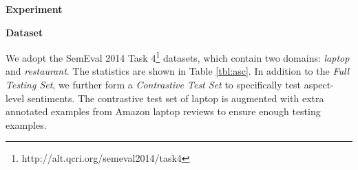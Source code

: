 

\textbf{Experiment}
\label{sec:exp}


\textbf{Dataset}

We adopt the SemEval 2014 Task 4\footnote{http://alt.qcri.org/semeval2014/task4} datasets, which 
contain two domains: \emph{laptop} and \emph{restaurant}. 
The statistics are shown in Table \ref{tbl:asc}. In addition to the \textit{Full Testing Set}, we further form a \textit{Contrastive Test Set} to specifically test aspect-level sentiments.
The contrastive test set of laptop is augmented with extra annotated examples from Amazon laptop reviews to ensure enough testing examples. 

